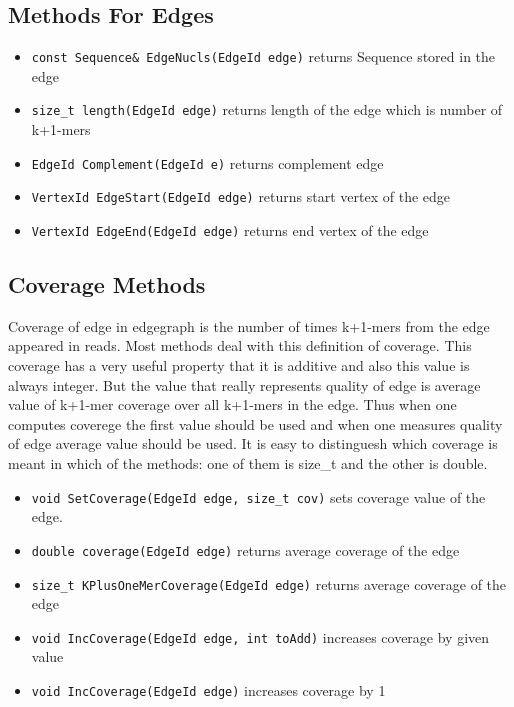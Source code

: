 \documentclass[a4paper,10pt]{article}
\begin{document}
\subsection*{Methods For Edges}
\begin{itemize}
\item \texttt{const Sequence\& EdgeNucls(EdgeId edge)} returns Sequence stored in the edge
\item \texttt{size\_t length(EdgeId edge)} returns length of the edge which is number of k+1-mers
\item \texttt{EdgeId Complement(EdgeId e)} returns complement edge
\item \texttt{VertexId EdgeStart(EdgeId edge)} returns start vertex of the edge
\item \texttt{VertexId EdgeEnd(EdgeId edge)} returns end vertex of the edge
\end{itemize}

\subsection*{Coverage Methods}
Coverage of edge in edgegraph is the number of times k+1-mers from the edge appeared in reads. Most methods deal with this 
definition of coverage. This coverage has a very useful property that it is additive and also this value is always integer. 
But the value that really represents quality of edge is average value of k+1-mer coverage over all k+1-mers in the edge.
Thus when one computes coverege the first value should be used and when one measures quality of edge average value should be used.
It is easy to distinguesh which coverage is meant in which of the methods: one of them is size\_t and the other is double.

\begin{itemize}
\item \texttt{void SetCoverage(EdgeId edge, size\_t cov)} sets coverage value of the edge.
\item \texttt{double coverage(EdgeId edge)} returns average coverage of the edge
\item \texttt{size\_t KPlusOneMerCoverage(EdgeId edge)} returns average coverage of the edge
\item \texttt{void IncCoverage(EdgeId edge, int toAdd)} increases coverage by given value
\item \texttt{void IncCoverage(EdgeId edge)} increases coverage by 1
\end{itemize}
\end{document}
